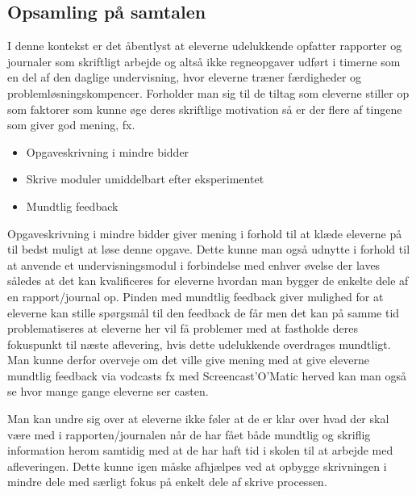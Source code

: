\subsection*{Opsamling på samtalen}
I denne kontekst er det åbentlyst at eleverne udelukkende opfatter rapporter og journaler som skriftligt arbejde og altså ikke regneopgaver udført i timerne som en del af den daglige undervisning, hvor eleverne træner færdigheder og problemløsningskompencer. Forholder man sig til de tiltag som eleverne stiller op som faktorer som kunne øge deres skriftlige motivation så er der flere af tingene som giver god mening, fx.
\begin{itemize}
	\item Opgaveskrivning i mindre bidder \vspace{-15pt}
	\item Skrive moduler umiddelbart efter eksperimentet\vspace{-15pt}
	\item Mundtlig feedback
\end{itemize}
Opgaveskrivning i mindre bidder giver mening i forhold til at klæde eleverne på til bedst muligt at løse denne opgave. Dette kunne man også udnytte i forhold til at anvende et undervisningsmodul i forbindelse med enhver øvelse der laves således at det kan kvalificeres for eleverne hvordan man bygger de enkelte dele af en rapport/journal op. 
Pinden med mundtlig feedback giver mulighed for at eleverne kan stille spørgsmål til den feedback de får men det kan på samme tid problematiseres at eleverne her vil få problemer med at fastholde deres fokuspunkt til næste aflevering, hvis dette udelukkende overdrages mundtligt. Man kunne derfor overveje om det ville give mening med at give eleverne mundtlig feedback via vodcasts fx med Screencast'O'Matic herved kan man også se hvor mange gange eleverne ser casten.

Man kan undre sig over at eleverne ikke føler at de er klar over hvad der skal være med i rapporten/journalen når de har fået både mundtlig og skriflig information herom samtidig med at de har haft tid i skolen til at arbejde med afleveringen. Dette kunne igen måske afhjælpes ved at opbygge skrivningen i mindre dele med særligt fokus på enkelt dele af skrive processen.

